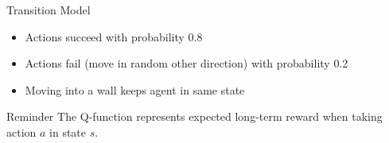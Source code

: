 \documentclass[aspectratio=169,xcolor=dvipsnames,svgnames,x11names,fleqn]{beamer}
\begin{document}
\begin{frame}{Transition Model}
    \begin{tcolorbox}[colback=lightblue!10,colframe=blue!60!black,title=Stochastic Environment]
        \begin{itemize}
            \item Actions succeed with probability 0.8
            \item Actions fail (move in random other direction) with probability 0.2
            \item Moving into a wall keeps agent in same state
        \end{itemize}
    \end{tcolorbox}
    
    \begin{tblock}{Reminder}
        The Q-function represents expected long-term reward when taking action $a$ in state $s$.
    \end{tblock}
\end{frame}
\end{document}
